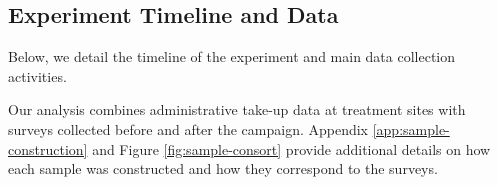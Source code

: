 
\subsection{Experiment Timeline and Data}

Below, we detail the timeline of the experiment and main data collection activities. 

\begin{figure}[H]

\label{fig:timeline}
\end{figure}

Our analysis combines administrative take-up data at treatment sites with surveys collected before and after the campaign. Appendix \ref{app:sample-construction} and Figure \ref{fig:sample-consort} provide additional details on how each sample was constructed and how they correspond to the surveys.


